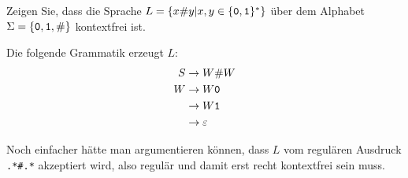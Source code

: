 Zeigen Sie, dass die Sprache $L=\{x{\tt\#}y|x,y\in\{{\tt 0},{\tt 1}\}^*\}$
über dem Alphabet $\Sigma = \{{\tt 0},{\tt 1},{\tt \#}\}$
kontextfrei ist.

\begin{loesung}
Die folgende Grammatik erzeugt $L$:
\begin{align*}
S&\to W {\tt \#} W\\
W&\to W{\tt 0}\\
 &\to W{\tt 1}\\
 &\to\varepsilon
\end{align*}

Noch einfacher hätte man argumentieren können, dass $L$
vom regulären Ausdruck {\tt .*\#.*} akzeptiert wird, also
regulär und damit erst recht kontextfrei sein muss.
\end{loesung}
